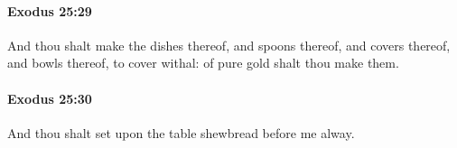 		\paragraph{Exodus 25:29} %
			\label{EXODUS-25-29}

			And thou shalt make the dishes thereof, and spoons thereof, and covers thereof, and bowls thereof, to cover withal: of pure gold shalt thou make them.


		\paragraph{Exodus 25:30} %
			\label{EXODUS-25-30}

			And thou shalt set upon the table shewbread before me alway.


